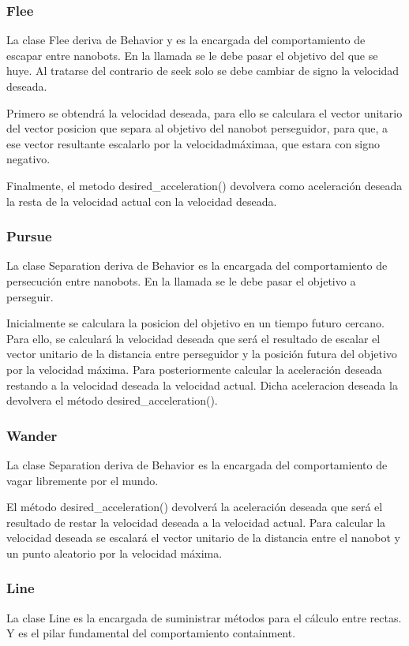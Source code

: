 \subsubsection{Flee}
\label{sec:flee}
La clase Flee deriva de Behavior y es la encargada del comportamiento de escapar entre nanobots. En la llamada se le debe pasar el objetivo del que se huye. Al tratarse del contrario de seek solo se debe cambiar de signo la velocidad deseada.

Primero se obtendrá la velocidad deseada, para ello se calculara el vector unitario del vector posicion que separa al objetivo del nanobot perseguidor, para que, a ese vector resultante escalarlo por la  velocidadmáximaa, que estara con signo negativo.

Finalmente, el metodo desired\_acceleration() devolvera como aceleración deseada la resta de la velocidad actual con la velocidad deseada.

\subsubsection{Pursue}
\label{sec:pursue}
La clase Separation deriva de Behavior es la encargada del comportamiento de persecución entre nanobots.  En la llamada se le debe pasar el objetivo a perseguir.

Inicialmente se calculara la posicion del objetivo en un tiempo futuro cercano. Para ello, se calculará la velocidad deseada que será el resultado de escalar el vector unitario de la distancia entre perseguidor y la posición futura del objetivo por la velocidad máxima. Para posteriormente calcular la aceleración deseada restando a la velocidad deseada la velocidad actual. Dicha aceleracion deseada la devolvera el método desired\_acceleration().



\subsubsection{Wander}
\label{sec:wander}
La clase Separation deriva de Behavior es la encargada del comportamiento de vagar libremente por el mundo.

El método desired\_acceleration() devolverá la aceleración deseada que será el resultado de restar la velocidad deseada a la velocidad actual. Para calcular la velocidad deseada se escalará el vector unitario de la distancia entre el nanobot y un punto aleatorio por la velocidad máxima. 

\subsubsection{Line}
\label{sec:line}
La clase Line es la encargada de suministrar métodos para el cálculo entre rectas. Y es el pilar fundamental del comportamiento containment.

